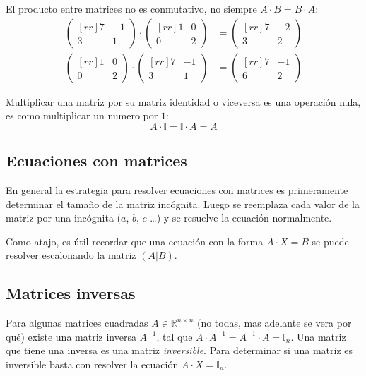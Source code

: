 \documentclass[../teoria.root.tex]{subfiles}
\begin{document}
El producto entre matrices no es conmutativo, no siempre $A\cdot B=B\cdot A$:
\begin{align*}
	\begin{pmatrix}[rr]
		7 & -1 \\
		3 & 1
	\end{pmatrix}\cdot\begin{pmatrix}[rr]
		1 & 0 \\
		0 & 2
	\end{pmatrix}&=\begin{pmatrix}[rr]
		7 & -2 \\
		3 & 2
	\end{pmatrix}\\
	\begin{pmatrix}[rr]
		1 & 0 \\
		0 & 2
	\end{pmatrix}\cdot\begin{pmatrix}[rr]
		7 & -1 \\
		3 & 1
	\end{pmatrix}&=\begin{pmatrix}[rr]
		7 & -1 \\
		6 & 2
	\end{pmatrix}
\end{align*}

Multiplicar una matriz por su matriz identidad o viceversa es una operación
nula, es como multiplicar un numero por $1$:
\[A\cdot\mathbb{I}=\mathbb{I}\cdot A=A\]

\subsection{Ecuaciones con matrices}

En general la estrategia para resolver ecuaciones con matrices es primeramente
determinar el tamaño de la matriz incógnita. Luego se reemplaza cada valor de
la matriz por una incógnita ($a$, $b$, $c$ \ldots) y se resuelve la ecuación
normalmente.

Como atajo, es útil recordar que una ecuación con la forma $A\cdot X=B$ se
puede resolver escalonando la matriz $(A|B)$.

\subsection{Matrices inversas}

Para algunas matrices cuadradas $A\in\mathbb{R}^{n\times n}$ (no todas, mas
adelante se vera por qué) existe una matriz inversa $A^{-1}$, tal que $A\cdot
A^{-1}=A^{-1}\cdot A=\mathbb{I}_n$. Una matriz que tiene una inversa es una
matriz \textit{inversible}. Para determinar si una matriz es inversible basta
con resolver la ecuación $A\cdot X=\mathbb{I}_n$.
\end{document}
